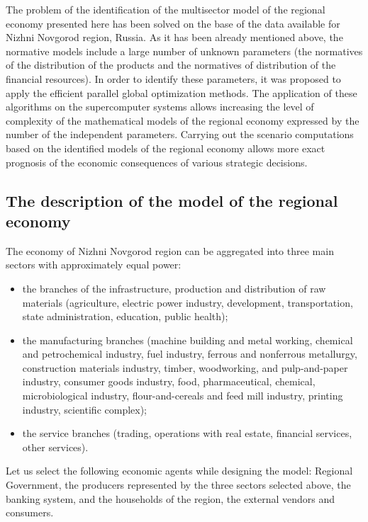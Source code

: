 The problem of the identification of the multisector model of the regional economy presented here has been solved on the base of the data available for Nizhni Novgorod region, Russia. As it has been already mentioned above, the normative models include a large number of unknown parameters (the normatives of the distribution of the products and the normatives of distribution of the financial resources). In order to identify these parameters, it was proposed to apply the efficient parallel global optimization methods. The application of these algorithms on the supercomputer systems allows increasing the level of complexity of the mathematical models of the regional economy expressed by the number of the independent parameters. Carrying out the scenario computations based on the identified models of the regional economy allows more exact prognosis of the economic consequences of various strategic decisions.

\subsection{The description of the model of the regional economy}

The economy of Nizhni Novgorod region can be aggregated into three main sectors with approximately equal power:
\begin{itemize}
	\item the branches of the infrastructure, production and distribution of raw materials (agriculture, electric power industry, development, transportation, state administration, education, public health);
	\item the manufacturing branches (machine building and metal working, chemical and petrochemical industry, fuel industry, ferrous and nonferrous metallurgy, construction materials industry, timber, woodworking, and pulp-and-paper industry, consumer goods industry, food, pharmaceutical, chemical, microbiological industry, flour-and-cereals and feed mill industry, printing industry, scientific complex);
	\item the service branches (trading, operations with real estate, financial services, other services).
\end{itemize}

Let us select the following economic agents while designing the model: Regional Government, the producers represented by the three sectors selected above, the banking system, and the households of the region, the external vendors and consumers.

